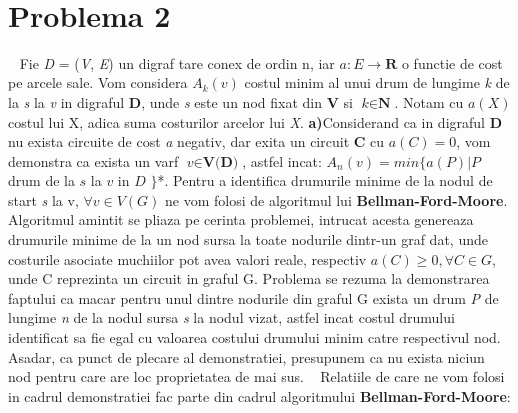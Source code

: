 \documentclass{article}
\begin{document}
\
\section{Problema 2} 
\
\newline
Fie \textit{D} = (\textit{V}, \textit{E}) un digraf tare conex de ordin n, iar  $a \colon E \to \textbf{R}$ o functie de cost pe arcele sale.
Vom considera $A_k(v)$ costul minim al unui drum de lungime \textit{k} de la \textit{s} la \textit{v} in digraful \textbf{D}, unde \textit{s} este un nod fixat din \textbf{V} si $\textit{k} \in \textbf{N}$. Notam cu $a(\textit{X})$ costul lui X, adica suma costurilor arcelor lui \textit{X}.
\newline
\newline
\textbf{a)}Considerand ca in digraful \textbf{D} nu exista circuite de cost \textit{a} negativ, dar exita un circuit \textbf{C} cu $a(C)=0$, vom demonstra ca exista un varf $\textit{v}\in\textbf{V(D)}$, astfel incat:
$A_n(v)=min\{a(P)|P$ drum de la $s$ la $v$ in $D$ $\}$*. 
\newline
\newline
Pentru a identifica drumurile minime de la nodul de start \textit{s} la v, $\forall v \in V(G)$ ne vom folosi de algoritmul lui
\textbf{Bellman-Ford-Moore}. Algoritmul amintit se pliaza pe cerinta problemei, intrucat acesta genereaza drumurile minime de la un nod sursa la toate nodurile dintr-un graf dat, unde costurile asociate muchiilor pot avea valori reale, respectiv $a(C)\geq 0, \forall C \in G$, unde C reprezinta un circuit in graful G. 
\newline
\newline
Problema se rezuma la demonstrarea faptului ca macar pentru unul dintre nodurile din graful G exista un drum \textit{P} de lungime \textit{n} de la nodul sursa \textit{s} la nodul vizat, astfel incat costul drumului identificat sa fie egal cu valoarea costului drumului minim catre respectivul nod.
Asadar, ca punct de plecare al demonstratiei, presupunem ca nu exista niciun nod pentru care are loc proprietatea de mai sus.
\
\newline
\newline
Relatiile de care ne vom folosi in cadrul demonstratiei fac parte din cadrul algoritmului \textbf{Bellman-Ford-Moore}:
\end{document}
